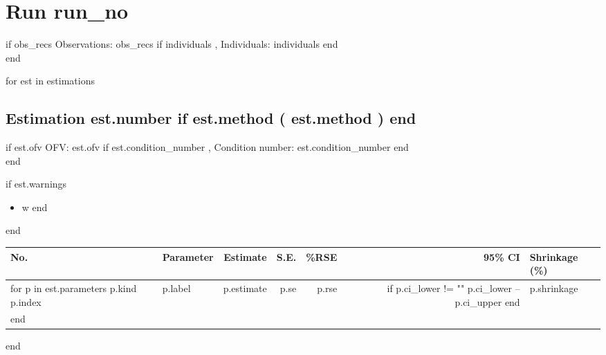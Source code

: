 \documentclass[12pt]{article}
\begin{document}
\section*{Run {{ run_no }}}
{{ if obs_recs }}Observations: {{ obs_recs }}{{ if individuals }}, Individuals: {{ individuals }}{{ end }}\\{{ end }}

{{ for est in estimations }}
\subsection*{Estimation {{ est.number }}{{ if est.method }} ({{ est.method }}){{ end }}}
{{ if est.ofv }}OFV: {{ est.ofv }}{{ if est.condition_number }}, Condition number: {{ est.condition_number }}{{ end }}\\{{ end }}

{{ if est.warnings }}
\begin{itemize}
{{ for w in est.warnings }}\item {{ w }}
{{ end }}\end{itemize}
{{ end }}

\begin{longtable}{llrrrrl}
\toprule
No. & Parameter & Estimate & S.E. & \%RSE & 95\% CI & Shrinkage (\%) \\
\midrule
\endhead
{{ for p in est.parameters }}{{ p.kind }}{{ p.index }} & {{ p.label }} & {{ p.estimate }} & {{ p.se }} & {{ p.rse }} & {{ if p.ci_lower != "" }}{{ p.ci_lower }}--{{ p.ci_upper }}{{ end }} & {{ p.shrinkage }} \\
{{ end }}\bottomrule
\end{longtable}

{{ end }}
\end{document}
